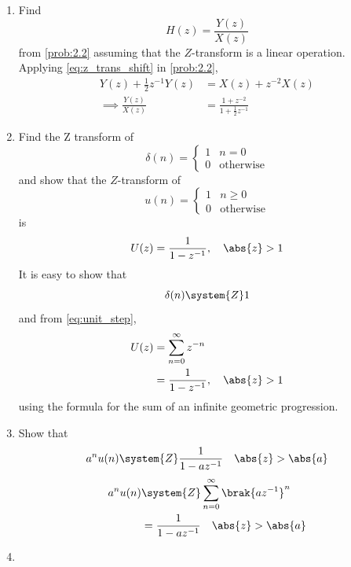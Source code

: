 \documentclass[journal,12pt,twocolumn]{IEEEtran}
\theoremstyle{remark}
\begin{document}
\begin{enumerate}[label=\thesection.\arabic*]
\item Find
%
\begin{equation}
H(z) = \frac{Y(z)}{X(z)}
\end{equation}
from  \eqref{prob:2.2} assuming that the $Z$-transform is a linear operation.
\\
\solution  Applying \eqref{eq:z_trans_shift} in \eqref{prob:2.2},
\begin{align}
Y(z) + \frac{1}{2}z^{-1}Y(z) &= X(z)+z^{-2}X(z)
\\
\implies \frac{Y(z)}{X(z)} &= \frac{1 + z^{-2}}{1 + \frac{1}{2}z^{-1}}
\label{eq:freq_resp}
\end{align}
%
\item Find the Z transform of 
\begin{equation}
\delta(n)
=
\begin{cases}
1 & n = 0
\\
0 & \text{otherwise}
\end{cases}
\end{equation}
and show that the $Z$-transform of
\begin{equation}
\label{eq:unit_step}
u(n)
=
\begin{cases}
1 & n \ge 0
\\
0 & \text{otherwise}
\end{cases}
\end{equation}
is
\begin{equation}
U(z) = \frac{1}{1-z^{-1}}, \quad \abs{z} > 1
\end{equation}
\solution It is easy to show that
\begin{equation}
\delta(n) \system{Z} 1
\end{equation}
and from \eqref{eq:unit_step},
\begin{align}
U(z) &= \sum _{n= 0}^{\infty}z^{-n}
\\
&=\frac{1}{1-z^{-1}}, \quad \abs{z} > 1
\end{align}
using the formula for the sum of an infinite geometric progression.
%
\item Show that 
\begin{equation}
\label{eq:anun}
a^nu(n) \system{Z} \frac{1}{1-az^{-1}} \quad \abs{z} > \abs{a}
\end{equation}
\solution 
\begin{align}
	a^nu(n) &\system{Z} \sum_{n = 0}^{\infty}\brak{az^{-1}}^n \\
			&= \frac{1}{1-az^{-1}} \quad \abs{z} > \abs{a}
\end{align}
%
\item 

\end{enumerate}
\end{document}
